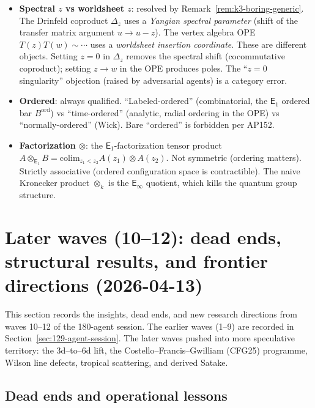 \documentclass[11pt]{article}
\newcommand{\Eone}{\mathsf{E}_1}
\newcommand{\Einf}{\mathsf{E}_{\infty}}
\begin{document}
\begin{itemize}
 \item \textbf{Spectral $z$ vs worldsheet $z$}: resolved by
 Remark~\ref{rem:k3-boring-generic}. The Drinfeld coproduct
 $\Delta_z$ uses a \emph{Yangian spectral parameter} (shift of the
 transfer matrix argument $u \to u - z$). The vertex algebra OPE
 $T(z) T(w) \sim \cdots$ uses a \emph{worldsheet insertion
 coordinate}. These are different objects. Setting $z = 0$ in
 $\Delta_z$ removes the spectral shift (cocommutative coproduct);
 setting $z \to w$ in the OPE produces poles. The ``$z = 0$
 singularity'' objection (raised by adversarial agents) is a
 category error.

 \item \textbf{Ordered}: always qualified. ``Labeled-ordered''
 (combinatorial, the $\Eone$ ordered bar $B^{\mathrm{ord}}$) vs
 ``time-ordered'' (analytic, radial ordering in the OPE) vs
 ``normally-ordered'' (Wick). Bare ``ordered'' is forbidden per AP152.

 \item \textbf{Factorization $\otimes$}: the $\Eone$-factorization
 tensor product $A \otimes_{\Eone} B = \mathrm{colim}_{z_1 < z_2}
 A(z_1) \otimes A(z_2)$. Not symmetric (ordering matters). Strictly
 associative (ordered configuration space is contractible). The
 naive Kronecker product $\otimes_k$ is the $\Einf$ quotient, which
 kills the quantum group structure.
\end{itemize}

\section{Later waves (10--12): dead ends, structural results, and frontier directions (2026-04-13)}
\label{sec:later-waves}

This section records the insights, dead ends, and new research
directions from waves 10--12 of the 180-agent session. The earlier
waves (1--9) are recorded in Section~\ref{sec:129-agent-session}.
The later waves pushed into more speculative territory: the 3d--to--6d
lift, the Costello--Francis--Gwilliam (CFG25) programme, Wilson line
defects, tropical scattering, and derived Satake.

\subsection{Dead ends and operational lessons}
\label{subsec:later-dead-ends}
\end{document}
